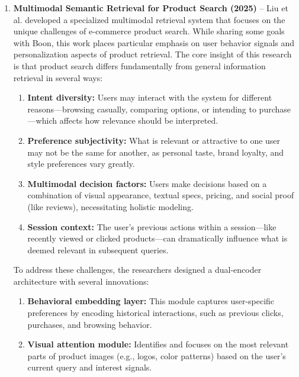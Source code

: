 \documentclass[conference]{IEEEtran}
\begin{document}
\begin{enumerate}
\item \textbf{Multimodal Semantic Retrieval for Product Search (2025)} – Liu et al. \cite{liu2025multimodal} developed a specialized multimodal retrieval system that focuses on the unique challenges of e-commerce product search. While sharing some goals with Boon, this work places particular emphasis on user behavior signals and personalization aspects of product retrieval.
The core insight of this research is that product search differs fundamentally from general information retrieval in several ways:

\begin{enumerate}
    \item \textbf{Intent diversity:} Users may interact with the system for different reasons—browsing casually, comparing options, or intending to purchase—which affects how relevance should be interpreted.
    
    \item \textbf{Preference subjectivity:} What is relevant or attractive to one user may not be the same for another, as personal taste, brand loyalty, and style preferences vary greatly.
    
    \item \textbf{Multimodal decision factors:} Users make decisions based on a combination of visual appearance, textual specs, pricing, and social proof (like reviews), necessitating holistic modeling.
    
    \item \textbf{Session context:} The user's previous actions within a session—like recently viewed or clicked products—can dramatically influence what is deemed relevant in subsequent queries.
\end{enumerate}

To address these challenges, the researchers designed a dual-encoder architecture with several innovations:

\begin{enumerate}
    \item \textbf{Behavioral embedding layer:} This module captures user-specific preferences by encoding historical interactions, such as previous clicks, purchases, and browsing behavior.
    
    \item \textbf{Visual attention module:} Identifies and focuses on the most relevant parts of product images (e.g., logos, color patterns) based on the user's current query and interest signals.
    

\end{enumerate}
\end{enumerate}
\end{document}
